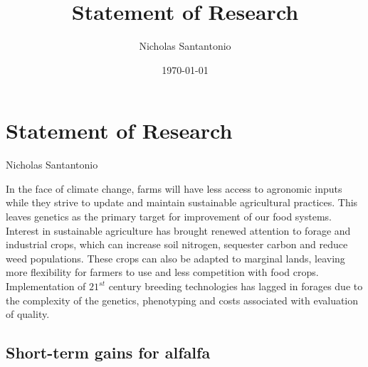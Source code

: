 \documentclass[11pt]{article}
\title{Statement of Research}
\author{Nicholas Santantonio}
\date{\today}
\begin{document}
\section*{\centering Statement of Research}
\begin{center} Nicholas Santantonio \end{center}







\noindent In the face of climate change, farms will have less access to agronomic inputs while they strive to update and maintain sustainable agricultural practices. This leaves genetics as the primary target for improvement of our food systems. Interest in sustainable agriculture has brought renewed attention to forage and industrial crops, which can increase soil nitrogen, sequester carbon and reduce weed populations. These crops can also be adapted to marginal lands, leaving more flexibility for farmers to use and less  competition with food crops. Implementation of $21^{st}$ century breeding technologies has lagged in forages due to the complexity of the genetics, phenotyping and costs associated with evaluation of quality.



\subsection*{Short-term gains for alfalfa}
\end{document}
